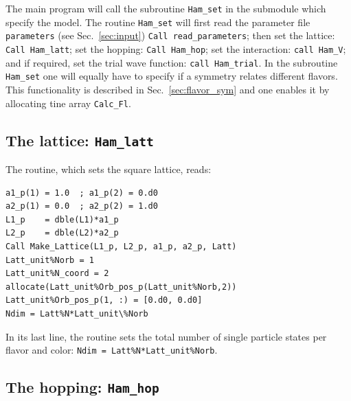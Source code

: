The main program will call the subroutine \texttt{Ham\_set} in the submodule 
which specify the model.  The  routine \texttt{Ham\_set}  will first  read the parameter file \texttt{parameters} (see Sec.~\ref{sec:input}) \texttt{Call read\_parameters}; then set the lattice: \texttt{Call Ham\_latt};  set the hopping: \texttt{Call Ham\_hop};  
 set the interaction: \texttt{call Ham\_V}; and if required, set the trial wave function: \texttt{call Ham\_trial}.     In the  subroutine   \texttt{Ham\_set} one  
 will equally  have  to  specify  if  a  symmetry  relates   different  flavors.   This functionality  is   described in  Sec.~\ref{sec:flavor_sym}   and   one  enables it  by allocating  tine  array  \texttt{Calc\_Fl}. 
 
\subsection{The lattice: \texttt{Ham\_latt}} \label{U_PV_Ham_latt}

The routine, which sets the square lattice, reads:
\begin{lstlisting}[style=fortran]
a1_p(1) = 1.0  ; a1_p(2) = 0.d0
a2_p(1) = 0.0  ; a2_p(2) = 1.d0
L1_p    = dble(L1)*a1_p
L2_p    = dble(L2)*a2_p
Call Make_Lattice(L1_p, L2_p, a1_p, a2_p, Latt)
Latt_unit%Norb = 1
Latt_unit%N_coord = 2
allocate(Latt_unit%Orb_pos_p(Latt_unit%Norb,2))
Latt_unit%Orb_pos_p(1, :) = [0.d0, 0.d0]
Ndim = Latt%N*Latt_unit\%Norb

\end{lstlisting}
In its last line, the routine sets the total number of single particle states per flavor and color:
\texttt{Ndim = Latt\%N*Latt\_unit\%Norb}.

\subsection{The hopping: \texttt{Ham\_hop}} \label{U_PV_Ham_hop}

